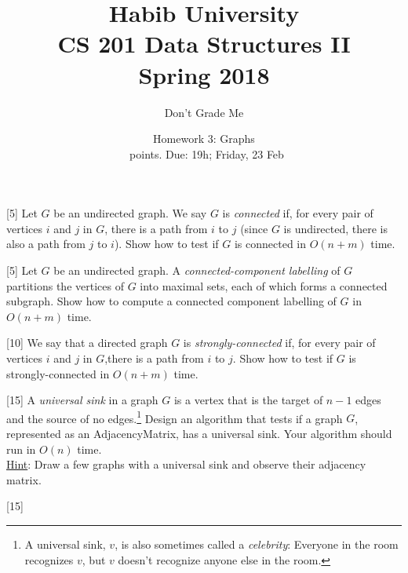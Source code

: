 \documentclass[addpoints]{exam}
\title{Habib University\\CS 201 Data Structures II\\Spring 2018}
\author{Don't Grade Me}  %
\date{Homework 3: Graphs\\\numpoints\ points. Due: 19h; Friday, 23 Feb}
\begin{document}
\maketitle

\begin{questions}

  [5]
  Let $G$ be an undirected graph. We say $G$ is {\it connected} if, for every pair of vertices $i$ and $j$ in $G$, there is a path from $i$ to $j$ (since $G$ is undirected, there is also a path from $j$ to $i$). Show how to test if $G$ is connected in $O(n + m)$ time.
  \begin{solution}
  \end{solution}

  [5]
  Let $G$ be an undirected graph. A {\it connected-component labelling} of $G$ partitions the vertices of $G$ into maximal sets, each of which forms a connected subgraph. Show how to compute a connected component labelling of $G$ in $O(n + m)$ time.
  \begin{solution}
  \end{solution}

  [10]
  We say that a directed graph $G$ is {\it strongly-connected} if, for every pair of vertices $i$ and $j$ in $G$,there is a path from $i$ to $j$. Show how to test if $G$ is strongly-connected in $O(n + m)$ time.
  \begin{solution}
  \end{solution}

  [15]
  A {\it universal sink} in a graph $G$ is a vertex that is the target of $n−1$ edges and the source of no edges.\footnote{A universal sink, $v$, is also sometimes called a {\it celebrity}: Everyone in the room recognizes $v$, but $v$ doesn't recognize anyone else in the room.} Design an algorithm that tests if a graph $G$, represented as an AdjacencyMatrix, has a universal sink. Your algorithm should run in $O(n)$ time.\\
  \underline{Hint}: Draw a few graphs with a universal sink and observe their adjacency matrix.
  \begin{solution}
  \end{solution}


  [15]


\end{questions}
\end{document}
